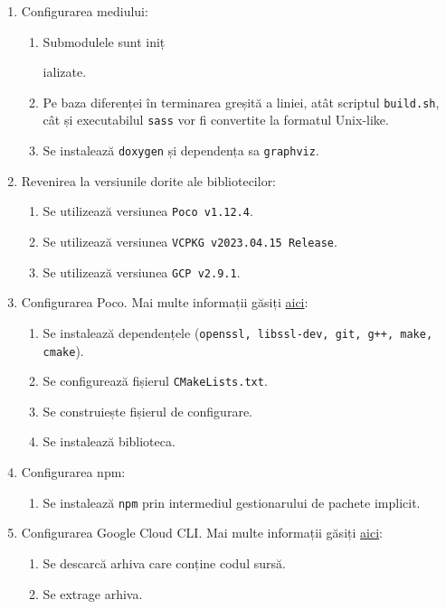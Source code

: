 \begin{enumerate}
  \item Configurarea mediului:
    \begin{enumerate}
      \item Submodulele sunt iniț

ializate.
      \item Pe baza diferenței în terminarea greșită a liniei, atât scriptul \texttt{build.sh}, cât și executabilul \texttt{sass} vor fi convertite la formatul Unix-like.
      \item Se instalează \texttt{doxygen} și dependența sa \texttt{graphviz}.
    \end{enumerate}
  \item Revenirea la versiunile dorite ale bibliotecilor:
    \begin{enumerate}
      \item Se utilizează versiunea \texttt{Poco v1.12.4}.
      \item Se utilizează versiunea \texttt{VCPKG v2023.04.15 Release}.
      \item Se utilizează versiunea \texttt{GCP v2.9.1}.
    \end{enumerate}
  \item Configurarea Poco. Mai multe informații găsiți \href{https://github.com/pocoproject/poco}{aici}:
    \begin{enumerate}
      \item Se instalează dependențele (\texttt{openssl, libssl-dev, git, g++, make, cmake}).
      \item Se configurează fișierul \texttt{CMakeLists.txt}.
      \item Se construiește fișierul de configurare.
      \item Se instalează biblioteca.
    \end{enumerate}
  \item Configurarea npm:
    \begin{enumerate}
      \item Se instalează \texttt{npm} prin intermediul gestionarului de pachete implicit.
    \end{enumerate}
  \item Configurarea Google Cloud CLI. Mai multe informații găsiți \href{https://cloud.google.com/sdk/docs/install}{aici}:
    \begin{enumerate}
      \item Se descarcă arhiva care conține codul sursă.
      \item Se extrage arhiva.

\end{enumerate}
\end{enumerate}
